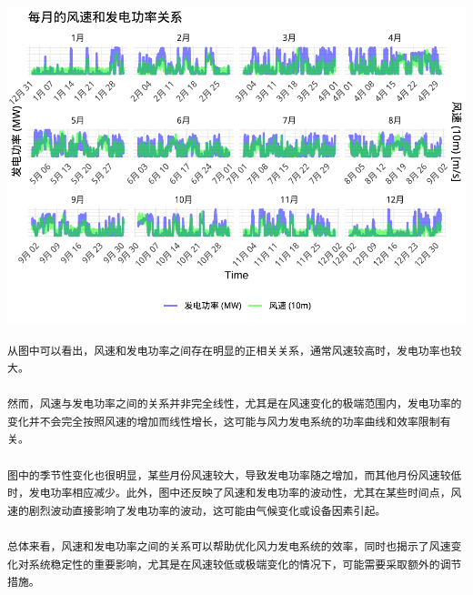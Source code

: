 \documentclass[
]{ctexart}
\begin{document}
\includegraphics{1_files/figure-latex/unnamed-chunk-7-1.pdf}

\begin{verbatim}
从图中可以看出，风速和发电功率之间存在明显的正相关关系，通常风速较高时，发电功率也较大。

然而，风速与发电功率之间的关系并非完全线性，尤其是在风速变化的极端范围内，发电功率的变化并不会完全按照风速的增加而线性增长，这可能与风力发电系统的功率曲线和效率限制有关。

图中的季节性变化也很明显，某些月份风速较大，导致发电功率随之增加，而其他月份风速较低时，发电功率相应减少。此外，图中还反映了风速和发电功率的波动性，尤其在某些时间点，风速的剧烈波动直接影响了发电功率的波动，这可能由气候变化或设备因素引起。

总体来看，风速和发电功率之间的关系可以帮助优化风力发电系统的效率，同时也揭示了风速变化对系统稳定性的重要影响，尤其是在风速较低或极端变化的情况下，可能需要采取额外的调节措施。
\end{verbatim}
\end{document}
